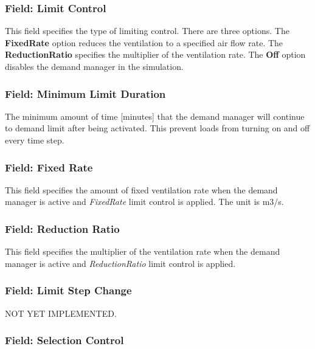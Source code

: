 \subsubsection{Field: Limit Control}\label{field-limit-control-3}

This field specifies the type of limiting control. There are three options. The \textbf{FixedRate} option reduces the ventilation to a specified air flow rate. The \textbf{ReductionRatio} specifies the multiplier of the ventilation rate. The \textbf{Off} option disables the demand manager in the simulation.

\subsubsection{Field: Minimum Limit Duration}\label{field-minimum-limit-duration-3}

The minimum amount of time {[}minutes{]} that the demand manager will continue to demand limit after being activated. This prevent loads from turning on and off every time step.

\subsubsection{Field: Fixed Rate}\label{field-fixed-rate}

This field specifies the amount of fixed ventilation rate when the demand manager is active and \emph{FixedRate} limit control is applied. The unit is m3/s.

\subsubsection{Field: Reduction Ratio}\label{field-reduction-ratio}

This field specifies the multiplier of the ventilation rate when the demand manager is active and \emph{ReductionRatio} limit control is applied.

\subsubsection{Field: Limit Step Change}\label{field-limit-step-change-3}

NOT YET IMPLEMENTED.

\subsubsection{Field: Selection Control}\label{field-selection-control-4}

